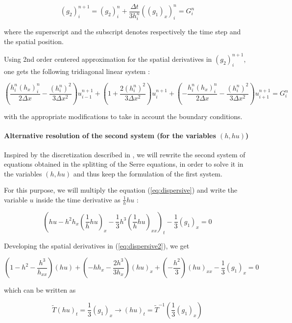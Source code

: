 $$(g_2)_i^{n+1} = (g_2)_i^n + \frac{\Delta t}{3h_i^n} \left(\left( g_1 \right)_x\right)_i^n = G_i^n$$

\noindent where the superscript and the subscript denotes respectively the time step and the spatial position.

\indent Using 2nd order centered approximation for the spatial derivatives in $(g_2)_i^{n+1}$, one gets the following tridiagonal linear system :

$$\left( \frac{h_i^n(h_x)_i^n}{2\Delta x} - \frac{(h_i^n)^2}{3\Delta x^2} \right)u_{i-1}^{n+1} + 
 \left( 1 + \frac{2(h_i^n)^2}{3\Delta x^2} \right)u_{i}^{n+1} + 
 \left( -\frac{h_i^n(h_x)_i^n}{2\Delta x} - \frac{(h_i^n)^2}{3\Delta x^2} \right)u_{i+1}^{n+1} = G_i^n $$
 
\noindent with the appropriate modifications to take in account the boundary conditions.
 
 
\paragraph{Alternative resolution of the second system (for the variables $(h,hu)$)}
 
\indent Inspired by the discretization described in \cite{Bonneton2011}, we will rewrite the second system of equations obtained in the splitting of the Serre equations, in order to solve it in the variables $(h,hu)$ and thus keep the formulation of the first system.
 
\indent For this purpose, we will multiply the equation (\ref{eq:dispersive}) and write the variable $u$ inside the time derivative as $\frac{1}{h} hu$ :
 
 \begin{equation}
\label{eq:dispersive2}
\left( hu - h^2h_x \left( \frac{1}{h} hu \right)_x - \frac{1}{3}h^3\left( \frac{1}{h} hu \right)_{xx} \right)_t  - \frac{1}{3}\left(g_1 \right)_x = 0
\end{equation}

\indent Developing the spatial derivatives in (\ref{eq:dispersive2}), we get

\begin{equation}
\label{eq:dispersive3}
       \left( 1-h^2 - \frac{h^3}{h_{xx}} \right)(hu) + \left( -hh_x - \frac{2h^3}{3h_{x}} \right)(hu)_x + \left( - \frac{h^2}{3} \right)(hu)_{xx} - \frac{1}{3}\left(g_1 \right)_x = 0
\end{equation}

\noindent which can be written as

\begin{equation}
    \tilde{T} (hu)_t = \frac{1}{3}\left(g_1 \right)_x \rightarrow (hu)_t = \tilde{T}^{-1}\left(\frac{1}{3}\left(g_1 \right)_x\right)
\end{equation}

